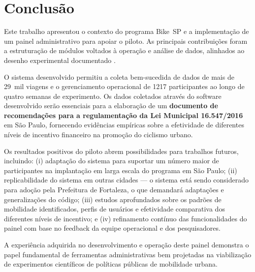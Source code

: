
\chapter{Conclusão}
\label{cap:conclusao}

Este trabalho apresentou o contexto do programa Bike~SP e a implementação de um
painel administrativo para apoiar o piloto. As principais contribuições foram a
estruturação de módulos voltados à operação e análise de dados, alinhados ao
desenho experimental documentado \citep{faria2023:bikespCaseStudy}.

O sistema desenvolvido permitiu a coleta bem-sucedida de dados de mais de 29~mil
viagens e o gerenciamento operacional de 1217 participantes ao longo de quatro
semanas de experimento. Os dados coletados através do software desenvolvido
serão essenciais para a elaboração de um \textbf{documento de recomendações para
a regulamentação da Lei Municipal 16.547/2016} em São Paulo, fornecendo
evidências empíricas sobre a efetividade de diferentes níveis de incentivo
financeiro na promoção do ciclismo urbano.

Os resultados positivos do piloto abrem possibilidades para trabalhos futuros,
incluindo: (i) adaptação do sistema para suportar um número maior de
participantes na implantação em larga escala do programa em São Paulo; (ii)
replicabilidade do sistema em outras cidades --- o sistema está sendo
considerado para adoção pela Prefeitura de Fortaleza, o que demandará adaptações
e generalizações do código; (iii) estudos aprofundados sobre os padrões de
mobilidade identificados, perfis de usuários e efetividade comparativa dos
diferentes níveis de incentivo; e (iv) refinamento contínuo das funcionalidades
do painel com base no feedback da equipe operacional e dos pesquisadores.

A experiência adquirida no desenvolvimento e operação deste painel demonstra o
papel fundamental de ferramentas administrativas bem projetadas na viabilização
de experimentos científicos de políticas públicas de mobilidade urbana.


